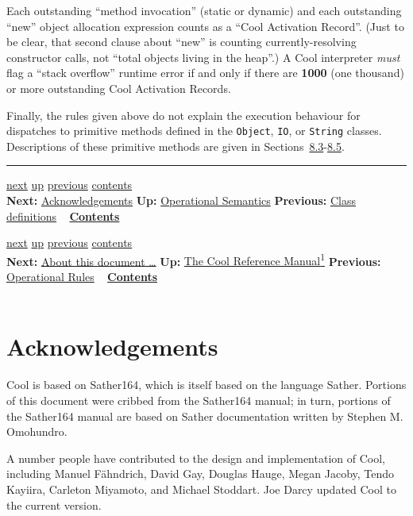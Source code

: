 \documentclass[]{article}
\begin{document}
Each outstanding ``method invocation'' (static or dynamic) and each
outstanding ``new'' object allocation expression counts as a ``Cool
Activation Record''. (Just to be clear, that second clause about ``new''
is counting currently-resolving constructor calls, not ``total objects
living in the heap''.) A Cool interpreter \emph{must} flag a ``stack
overflow'' runtime error if and only if there are \textbf{1000} (one
thousand) or more outstanding Cool Activation Records.

Finally, the rules given above do not explain the execution behaviour
for dispatches to primitive methods defined in the \texttt{Object},
\texttt{IO}, or \texttt{String} classes. Descriptions of these primitive
methods are given in
Sections~\href{node29.html\#sec-int}{8.3}-\href{node31.html\#sec-bool}{8.5}.

\begin{center}\rule{3in}{0.4pt}\end{center}

\href{node49.html}{next} \href{node44.html}{up}
\href{node47.html}{previous} \href{node1.html}{contents} \\
\textbf{Next:} \href{node49.html}{Acknowledgements} \textbf{Up:}
\href{node44.html}{Operational Semantics} \textbf{Previous:}
\href{node47.html}{Class definitions} ~
\textbf{\href{node1.html}{Contents}}

\href{node50.html}{next} \href{cool-manual.html}{up}
\href{node48.html}{previous} \href{node1.html}{contents} \\
\textbf{Next:} \href{node50.html}{About this document \ldots{}}
\textbf{Up:} \href{cool-manual.html}{The Cool Reference
Manual\textsuperscript{1}} \textbf{Previous:}
\href{node48.html}{Operational Rules} ~
\textbf{\href{node1.html}{Contents}} \\ \\

\section{Acknowledgements}

Cool is based on Sather164, which is itself based on the language
Sather. Portions of this document were cribbed from the Sather164
manual; in turn, portions of the Sather164 manual are based on Sather
documentation written by Stephen M. Omohundro.

A number people have contributed to the design and implementation of
Cool, including Manuel Fähndrich, David Gay, Douglas Hauge, Megan
Jacoby, Tendo Kayiira, Carleton Miyamoto, and Michael Stoddart. Joe
Darcy updated Cool to the current version.
\end{document}
